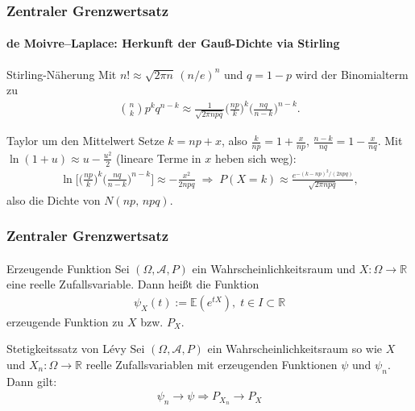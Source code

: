 \documentclass{beamer}
\begin{document}
\begin{frame}
    \frametitle{Zentraler Grenzwertsatz}
\framesubtitle{de Moivre--Laplace: Herkunft der Gauß-Dichte via Stirling}

{\small
\begin{block}{Stirling-Näherung}
Mit $n!\approx\sqrt{2\pi n}\,(n/e)^n$ und $q=1-p$ wird der Binomialterm zu
\begin{align*}
\binom{n}{k}p^k q^{n-k}\approx \frac{1}{\sqrt{2\pi npq}}\Big(\tfrac{np}{k}\Big)^{k}\Big(\tfrac{nq}{n-k}\Big)^{n-k}.
\end{align*}
\end{block}

\begin{block}{Taylor um den Mittelwert}
Setze $k=np+x$, also $\tfrac{k}{np}=1+\tfrac{x}{np}$, $\tfrac{n-k}{nq}=1-\tfrac{x}{nq}$. Mit $\ln(1+u)\approx u-\tfrac{u^2}{2}$ (lineare Terme in $x$ heben sich weg):
\begin{align*}
\ln\!\Big[\Big(\tfrac{np}{k}\Big)^{k}\Big(\tfrac{nq}{n-k}\Big)^{n-k}\Big]
\approx -\frac{x^2}{2npq}
\;\Rightarrow\;
P(X=k)\approx \frac{e^{-(k-np)^2/(2npq)}}{\sqrt{2\pi npq}},
\end{align*}
also die Dichte von $N(np,\,npq)$.
\end{block}
}
 \end{frame}


\begin{frame}
    \frametitle{Zentraler Grenzwertsatz}
\framesubtitle{}

\begin{block}{Erzeugende Funktion}
Sei $(\Omega, \mathcal{A}, P)$ ein Wahrscheinlichkeitsraum und $X :  \Omega \to \mathbb{R}$  eine reelle Zufallsvariable. Dann heißt die Funktion 
\begin{align*}
\psi_X(t) := \mathbb{E}(e^{tX}), \; t \in I \subset \mathbb{R}
\end{align*}
erzeugende Funktion zu $X$ bzw. $P_X$.
\end{block}

\begin{block}{Stetigkeitssatz von  Lévy }
Sei $(\Omega, \mathcal{A}, P)$ ein Wahrscheinlichkeitsraum so wie  $X$ und $X_n :  \Omega \to \mathbb{R}$   reelle Zufallsvariablen mit erzeugenden Funktionen $\psi$ und $\psi_{n}$. Dann gilt:
\begin{align*}
\psi_n \to \psi \Rightarrow P_{X_n} \to P_X 
\end{align*}
\end{block}

 \end{frame}
\end{document}
